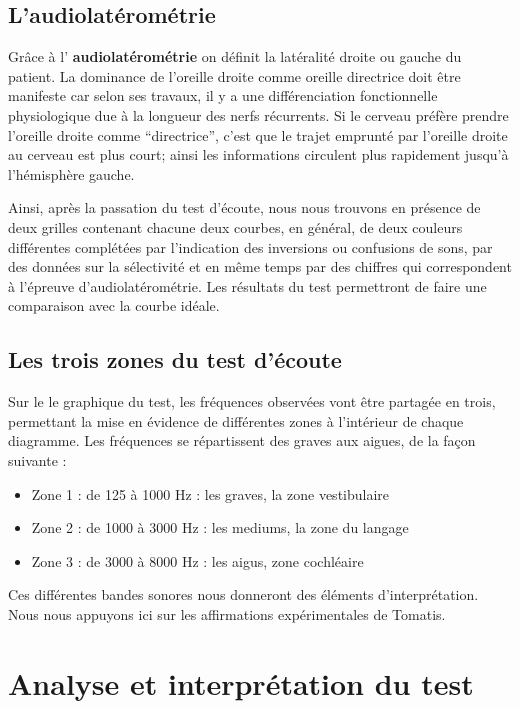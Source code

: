 \subsection{ L'audiolatérométrie}
  
Grâce à l'\textbf{ audiolatérométrie} on définit  la latéralité droite ou gauche du patient. La dominance
de l'oreille droite comme oreille directrice doit être manifeste car
selon ses travaux, il y a une différenciation fonctionnelle
physiologique due à la longueur des nerfs récurrents. 
Si le cerveau préfère prendre l'oreille droite comme
``directrice'', c'est que le trajet emprunté par l'oreille droite au cerveau est plus
court;
ainsi
les informations circulent plus rapidement jusqu'à l'hémisphère gauche.


      



 
Ainsi, après la passation du test d\textquoteright écoute, nous nous
trouvons en présence de deux grilles contenant chacune deux courbes,
en général, de deux couleurs différentes complétées par l'indication
des inversions ou confusions de sons, par des données sur la sélectivité
et en même temps par des chiffres qui correspondent à l'épreuve d'audiolatérométrie.
Les résultats du test permettront de faire une comparaison avec la
courbe idéale.


\subsection{Les trois zones du test d'écoute }
Sur le le graphique du test, les fréquences observées vont être partagée en
trois, permettant la mise en évidence de différentes zones à l\textquoteright intérieur
de chaque diagramme. Les fréquences se répartissent des 
graves aux aigues, de la façon suivante :
\begin{itemize}
\item Zone 1 : de 125 à 1000 Hz : les graves, la zone vestibulaire
\item Zone 2 : de 1000 à 3000 Hz : les mediums, la zone du langage
\item Zone 3 : de 3000 à 8000 Hz : les aigus, zone cochléaire
\end{itemize}
Ces différentes bandes sonores nous donneront des éléments
d'interprétation.
Nous nous appuyons ici sur les affirmations expérimentales de Tomatis.


\section {Analyse et interprétation du test}


